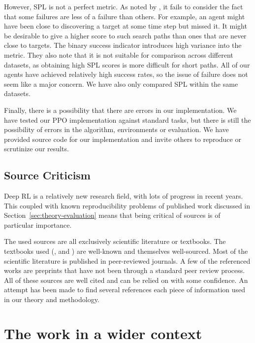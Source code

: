 However, SPL is not a perfect metric. As noted by \cite{batra_objectnav_2020}, it fails to consider the fact that some failures are less of a failure than others.
For example, an agent might have been close to discovering a target at some time step but missed it.
It might be desirable to give a higher score to such search paths than ones that are never close to targets.
The binary success indicator introduces high variance into the metric.
They also note that it is not suitable for comparison across different datasets, as obtaining high SPL scores is more difficult for short paths.
All of our agents have achieved relatively high success rates, so the issue of failure does not seem like a major concern.
We have also only compared SPL within the same datasets.

Finally, there is a possibility that there are errors in our implementation.
We have tested our PPO implementation against standard tasks, but there is still the possibility of errors in the algorithm, environments or evaluation.
We have provided source code for our implementation and invite others to reproduce or scrutinize our results.

\subsection{Source Criticism}

Deep RL is a relatively new research field, with lots of progress in recent years.
This coupled with known reproducibility problems of published work discussed in Section~\ref{sec:theory-evaluation} means that being critical of sources is of particular importance.

The used sources are all exclusively scientific literature or textbooks.
The textbooks used (\cite{russell_artificial_2021}, \cite{sutton_reinforcement_2018} and \cite{goodfellow_deep_2016}) are well-known and themselves well-sourced.
Most of the scientific literature is published in peer-reviewed journals.
A few of the referenced works are preprints that have not been through a standard peer review process.
All of these sources are well cited and can be relied on with some confidence.
An attempt has been made to find several references each piece of information used in our theory and methodology.

\section{The work in a wider context}
\label{sec:discussion-wider}

